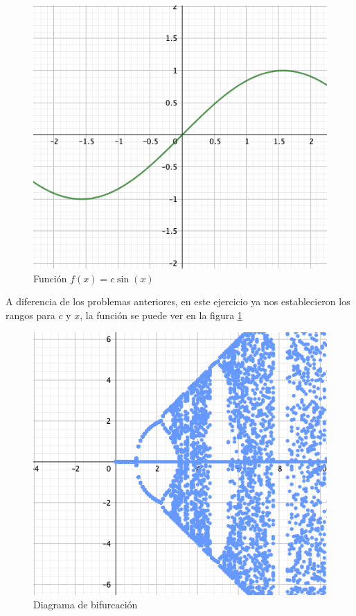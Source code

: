 \documentclass[11pt]{report}
\theoremstyle{plain}
\theoremstyle{definition}
\begin{document}
\begin{figure}[!h] %
	\centering
	\includegraphics[scale=0.3]{caos_3_1.png}
	\caption{Función $f(x) = c\sin(x)$}
	\label{fig:Eje3_1}
\end{figure}

A diferencia de los problemas anteriores, en este ejercicio ya nos establecieron los rangos para $c$ y $x$, la función se puede ver en la figura \ref{fig:Eje3_1}

\begin{figure}[!h] %
	\centering
	\includegraphics[scale=0.3]{caos_3_2.png}
	\caption{Diagrama de bifurcación}
	\label{fig:Eje3_2}
\end{figure}
\end{document}
